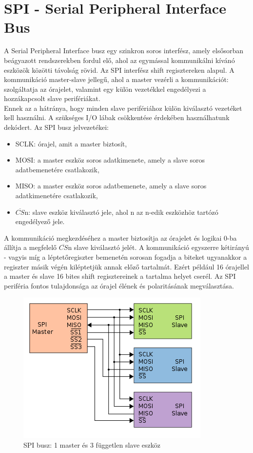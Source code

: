 \documentclass[a4paper,11pt]{article}
\begin{document}
\section{SPI - Serial Peripheral Interface Bus}
A Serial Peripheral Interface busz egy szinkron soros interfész, amely elsősorban beágyazott rendszerekben fordul elő, ahol az egymással kommunikálni kívánó eszközök közötti távolság rövid. Az SPI interfész shift regisztereken alapul. A kommunikáció master-slave jellegű, ahol a master vezérli a kommunikációt: szolgáltatja az órajelet, valamint egy külön vezetékkel engedélyezi a hozzákapcsolt slave perifériákat.\\
Ennek az a hátránya, hogy minden slave perifériához külön kiválasztó vezetéket kell használni. A szükséges I/O lábak csökkentése érdekében használhatunk dekódert. 
Az SPI busz jelvezetékei:
\begin{itemize}
	\item SCLK: órajel, amit a master biztosít,
	\item MOSI: a master eszköz soros adatkimenete, amely a slave soros adatbemenetére csatlakozik,
	\item MISO: a master eszköz soros adatbemenete, amely a slave soros adatkimenetére csatlakozik,
	\item $\overline{CS}$n: slave eszköz kiválasztó jele, ahol n az n-edik eszközhöz tartózó engedélyező jele.
\end{itemize}
A kommunikáció megkezdéséhez a master biztosítja az órajelet és logikai 0-ba állítja a megfelelő $\overline{CS}$n slave kiválasztó jelét. A kommunikáció egyszerre kétirányú - vagyis míg a léptetőregiszter bemenetén sorosan fogadja a biteket ugyanakkor a regiszter másik végén kiléptetjük annak előző tartalmát. Ezért például 16 órajellel a master és slave 16 bites shift regisztereinek a tartalma helyet cserél. Az SPI periféria fontos tulajdonsága az órajel élének és polaritásának megválasztása.
\begin{figure}[h!]
	\begin{center}
	\includegraphics[scale=0.7]{SPI_three_slaves.png}
	\caption{SPI busz: 1 master és 3 független slave eszköz}
	\label{fig:SPI_three_slaves}
	\end{center}
\end{figure}
\end{document}
